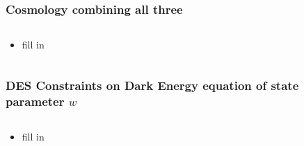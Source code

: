 \documentclass{beamer}
\begin{document}
\frame
{
    \frametitle{Cosmology combining all three}


    \begin{columns}
        \begin{column}{0.5\textwidth}    
            \begin{itemize}

                \item fill in

            \end{itemize}
        \end{column}
        \begin{column}{0.5\textwidth}
        \end{column}
    \end{columns}

}

\frame
{
    \frametitle{DES Constraints on Dark Energy equation of state parameter $w$}


    \begin{columns}
        \begin{column}{0.5\textwidth}    
            \begin{itemize}

                \item fill in

            \end{itemize}
        \end{column}
        \begin{column}{0.5\textwidth}
        \end{column}
    \end{columns}

}
\end{document}
